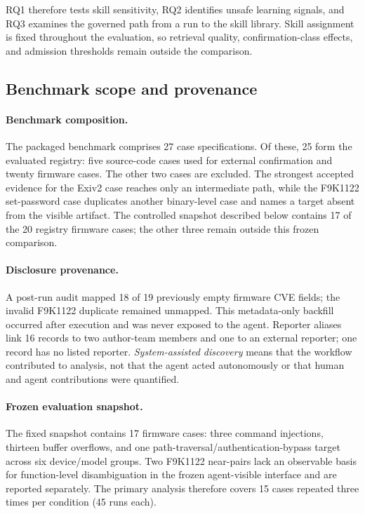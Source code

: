 \documentclass[11pt]{article}
\begin{document}
RQ1 therefore tests skill sensitivity, RQ2 identifies unsafe learning signals, and RQ3
examines the governed path from a run to the skill library.  Skill assignment is fixed
throughout the evaluation, so retrieval quality, confirmation-class effects, and
admission thresholds remain outside the comparison.

\subsection{Benchmark scope and provenance}

\paragraph{Benchmark composition.}

The packaged benchmark comprises 27 case specifications.  Of these, 25 form the
evaluated registry: five source-code cases used for external confirmation and twenty
firmware cases.  The other two cases are excluded.  The strongest accepted evidence for the Exiv2
case reaches only an intermediate path, while the F9K1122 set-password case duplicates
another binary-level case and names a target absent from the visible artifact.
The controlled snapshot described below contains 17 of the 20 registry firmware cases;
the other three remain outside this frozen comparison.

\paragraph{Disclosure provenance.}

A post-run audit mapped 18 of 19 previously empty firmware CVE fields; the invalid
F9K1122 duplicate remained unmapped.  This metadata-only backfill occurred after
execution and was never exposed to the agent.  Reporter aliases link 16 records to two
author-team members and one to an external reporter; one record has no listed reporter.
\emph{System-assisted discovery} means that the workflow contributed to analysis, not
that the agent acted autonomously or that human and agent contributions were quantified.

\paragraph{Frozen evaluation snapshot.}

The fixed snapshot contains 17 firmware cases: three command injections, thirteen
buffer overflows, and one path-traversal/authentication-bypass target across six
device/model groups.  Two F9K1122 near-pairs lack an observable basis for function-level
disambiguation in the frozen agent-visible interface and are reported separately.  The primary
analysis therefore covers 15 cases repeated three times per condition (45 runs each).
\end{document}
